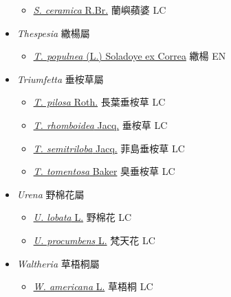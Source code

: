 \begin{itemize}
  \begin{itemize}
        \item[] \href{http://www.theplantlist.org/tpl1.1/search?q=Sterculia+ceramica}{\textit{S. ceramica} R.Br.}   蘭嶼蘋婆   LC
  \end{itemize}
 \item[] \textit{Thespesia} 繖楊屬
                                
  \begin{itemize}
        \item[] \href{http://www.theplantlist.org/tpl1.1/search?q=Thespesia+populnea}{\textit{T. populnea} (L.) Soladoye ex Correa}   繖楊   EN
  \end{itemize}
 \item[] \textit{Triumfetta} 垂桉草屬
                                
  \begin{itemize}
        \item[] \href{http://www.theplantlist.org/tpl1.1/search?q=Triumfetta+pilosa}{\textit{T. pilosa} Roth.}   長葉垂桉草   LC
        \item[] \href{http://www.theplantlist.org/tpl1.1/search?q=Triumfetta+rhomboidea}{\textit{T. rhomboidea} Jacq.}   垂桉草   LC
        \item[] \href{http://www.theplantlist.org/tpl1.1/search?q=Triumfetta+semitriloba}{\textit{T. semitriloba} Jacq.}   菲島垂桉草   LC
        \item[] \href{http://www.theplantlist.org/tpl1.1/search?q=Triumfetta+tomentosa}{\textit{T. tomentosa} Baker}   臭垂桉草   LC
  \end{itemize}
 \item[] \textit{Urena} 野棉花屬
                                
  \begin{itemize}
        \item[] \href{http://www.theplantlist.org/tpl1.1/search?q=Urena+lobata}{\textit{U. lobata} L.}   野棉花   LC
        \item[] \href{http://www.theplantlist.org/tpl1.1/search?q=Urena+procumbens}{\textit{U. procumbens} L.}   梵天花   LC
  \end{itemize}
 \item[] \textit{Waltheria} 草梧桐屬
                                
  \begin{itemize}
        \item[] \href{http://www.theplantlist.org/tpl1.1/search?q=Waltheria+americana}{\textit{W. americana} L.}   草梧桐   LC
  \end{itemize}
  \end{itemize}
